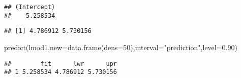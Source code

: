 \documentclass[
]{article}
\newenvironment{Shaded}{\begin{snugshade}}{\end{snugshade}}
\newcommand{\AttributeTok}[1]{\textcolor[rgb]{0.77,0.63,0.00}{#1}}
\newcommand{\DecValTok}[1]{\textcolor[rgb]{0.00,0.00,0.81}{#1}}
\newcommand{\FloatTok}[1]{\textcolor[rgb]{0.00,0.00,0.81}{#1}}
\newcommand{\FunctionTok}[1]{\textcolor[rgb]{0.00,0.00,0.00}{#1}}
\newcommand{\NormalTok}[1]{#1}
\newcommand{\OtherTok}[1]{\textcolor[rgb]{0.56,0.35,0.01}{#1}}
\newcommand{\SpecialCharTok}[1]{\textcolor[rgb]{0.00,0.00,0.00}{#1}}
\newcommand{\StringTok}[1]{\textcolor[rgb]{0.31,0.60,0.02}{#1}}
\begin{document}
\begin{Shaded}
\end{Shaded}

\begin{verbatim}
## (Intercept) 
##    5.258534
\end{verbatim}

\begin{Shaded}
\end{Shaded}

\begin{verbatim}
## [1] 4.786912 5.730156
\end{verbatim}

\begin{Shaded}
\begin{Highlighting}[]
\FunctionTok{predict}\NormalTok{(lmod1,}\AttributeTok{new=}\FunctionTok{data.frame}\NormalTok{(}\AttributeTok{dens=}\DecValTok{50}\NormalTok{),}\AttributeTok{interval=}\StringTok{"prediction"}\NormalTok{,}\AttributeTok{level=}\FloatTok{0.90}\NormalTok{)}
\end{Highlighting}
\end{Shaded}

\begin{verbatim}
##        fit      lwr      upr
## 1 5.258534 4.786912 5.730156
\end{verbatim}
\end{document}

